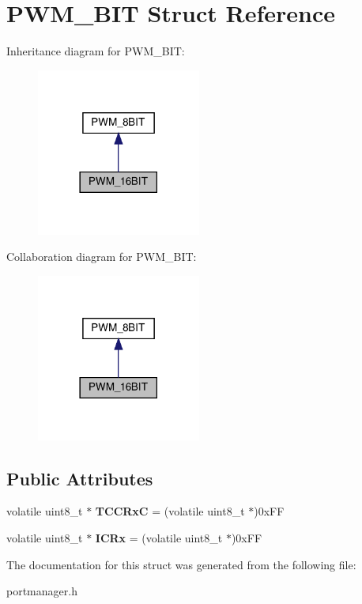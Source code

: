 \hypertarget{structPWM__16BIT}{}\section{P\+W\+M\+\_\+B\+IT Struct Reference}
\label{structPWM__16BIT}


Inheritance diagram for P\+W\+M\+\_\+B\+IT\+:\nopagebreak
\begin{figure}[H]
\begin{center}
\leavevmode
\includegraphics[width=153pt]{structPWM__16BIT__inherit__graph}
\end{center}
\end{figure}


Collaboration diagram for P\+W\+M\+\_\+B\+IT\+:\nopagebreak
\begin{figure}[H]
\begin{center}
\leavevmode
\includegraphics[width=153pt]{structPWM__16BIT__coll__graph}
\end{center}
\end{figure}
\subsection*{Public Attributes}
\begin{DoxyCompactItemize}
\item 
\mbox{\label{structPWM__16BIT_aed58d52d5a361e85b19d584d9b59f1b9}} 
volatile uint8\+\_\+t $\ast$ {\bfseries T\+C\+C\+RxC} = (volatile uint8\+\_\+t $\ast$)0x\+FF
\item 
\mbox{\label{structPWM__16BIT_a6e5ea7c07d0fa0f6970bbfe9c2a11677}} 
volatile uint8\+\_\+t $\ast$ {\bfseries I\+C\+Rx} = (volatile uint8\+\_\+t $\ast$)0x\+FF
\end{DoxyCompactItemize}


The documentation for this struct was generated from the following file\+:\begin{DoxyCompactItemize}
\item 
portmanager.\+h\end{DoxyCompactItemize}

